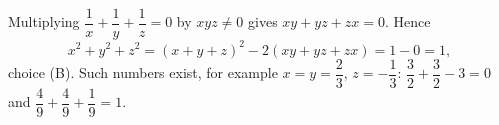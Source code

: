 Multiplying $\dfrac{1}{x}+\dfrac{1}{y}+\dfrac{1}{z}=0$ by $xyz\ne0$ gives $xy+yz+zx=0$. Hence
\[
x^2+y^2+z^2=(x+y+z)^2-2(xy+yz+zx)=1-0=\boxed{1},
\]
choice (B). Such numbers exist, for example $x=y=\dfrac{2}{3}$, $z=-\dfrac{1}{3}$: $\dfrac{3}{2}+\dfrac{3}{2}-3=0$ and $\dfrac{4}{9}+\dfrac{4}{9}+\dfrac{1}{9}=1$.

